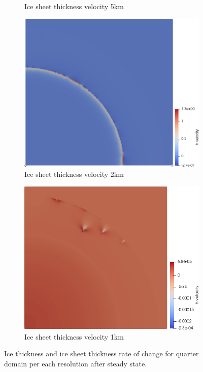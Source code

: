 \documentclass{article}
\begin{document}
\begin{figure}[!h]
\begin{minipage}[t]{.25\textwidth}
\begin{subfigure}{\textwidth}
			\caption{Ice sheet thickness velocity 5km}
			\label{hvelocity5km}
		\end{subfigure}\hfil %
		\begin{subfigure}{\textwidth}
			\includegraphics[width=\linewidth]{../fig/hvelocity_2km_quarter.png}
			\caption{Ice sheet thickness velocity 2km}
			\label{hvelocity2km}
		\end{subfigure}
				\begin{subfigure}{\textwidth}
			\includegraphics[width=\linewidth]{../fig/hvelocity_1km_quarter.png}
			\caption{Ice sheet thickness velocity 1km}
			\label{hvelocity1km}
		\end{subfigure}	
	\end{minipage}
	\caption{Ice thickness and ice sheet thickness rate of change for quarter domain per each resolution after steady state.}
	\label{h_and_h_velocities_cone}
\end{figure}
\end{document}

